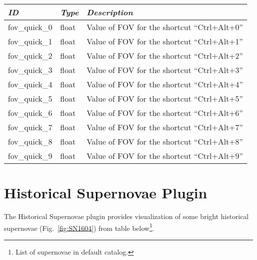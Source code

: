 \begin{longtabu} to \textwidth {l|l|X}\toprule
\emph{ID}            & \emph{Type} & \emph{Description}\\\midrule
fov\_quick\_0  & float & Value of FOV for the shortcut ``Ctrl+Alt+0'' \\\midrule
fov\_quick\_1  & float & Value of FOV for the shortcut ``Ctrl+Alt+1'' \\\midrule
fov\_quick\_2  & float & Value of FOV for the shortcut ``Ctrl+Alt+2'' \\\midrule
fov\_quick\_3  & float & Value of FOV for the shortcut ``Ctrl+Alt+3'' \\\midrule
fov\_quick\_4  & float & Value of FOV for the shortcut ``Ctrl+Alt+4'' \\\midrule
fov\_quick\_5  & float & Value of FOV for the shortcut ``Ctrl+Alt+5'' \\\midrule
fov\_quick\_6  & float & Value of FOV for the shortcut ``Ctrl+Alt+6'' \\\midrule
fov\_quick\_7  & float & Value of FOV for the shortcut ``Ctrl+Alt+7'' \\\midrule
fov\_quick\_8  & float & Value of FOV for the shortcut ``Ctrl+Alt+8'' \\\midrule
fov\_quick\_9  & float & Value of FOV for the shortcut ``Ctrl+Alt+9'' \\\bottomrule
\end{longtabu}

\newpage

\section{Historical Supernovae Plugin}
\label{sec:plugins:HistoricalSupernovae}
The Historical Supernovae plugin provides visualization of some bright historical supernovae (Fig.~\ref{fig:SN1604}) from table below\footnote{List of supernovae in default catalog.}.

